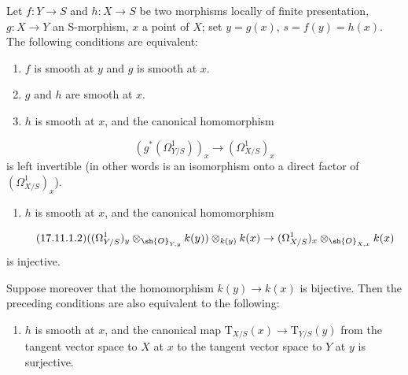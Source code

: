 \begin{theorem}[17.11.1]
\label{IV.17.11.1}
Let $f:Y\to S$ and $h:X\to S$ be two morphisms locally of finite presentation, $g:X\to Y$ an S-morphism, $x$ a point of $X$; set $y=g(x)$, $s=f(y)=h(x)$.
The following conditions are equivalent:
\begin{enumerate}
  \item[a)] $f$ is smooth at $y$ and $g$ is smooth at $x$.
  \item[b)] $g$ and $h$ are smooth at $x$.
  \item[c)] $h$ is smooth at $x$, and the canonical homomorphism 
\end{enumerate}
\begin{equation}
\label{IV.17.11.1.1}
\tag{17.11.1.1}
  (g^*(\Omega^1_{Y/S}))_x \to (\Omega^1_{X/S})_x
\end{equation}
is left invertible (in other words is an isomorphism onto a direct factor of $(\Omega^1_{X/S})_x$).
\begin{enumerate}
  \item[c')] $h$ is smooth at $x$, and the canonical homomorphism
\end{enumerate}
\begin{equation}
\label{IV.17.11.1.2}
\tag{17.11.1.2}
  ((\Omega^1_{Y/S})_y\otimes_{\sh{O}_{Y,y}} k(y))\otimes_{k(y)} k(x) \to (\Omega^1_{X/S})_x\otimes_{\sh{O}_{X,x}} k(x)
\end{equation}
is injective.

Suppose moreover that the homomorphism $k(y)\to k(x)$ is bijective.
Then the preceding conditions are also equivalent to the following:
\begin{enumerate}
  \item[d)] $h$ is smooth at $x$, and the canonical map
  $\mathrm{T}_{X/S}(x)\to\mathrm{T}_{Y/S}(y)$ 
  from the tangent vector space to $X$ at $x$ to the tangent vector space to $Y$ at $y$ is surjective.
\end{enumerate}
\end{theorem}


